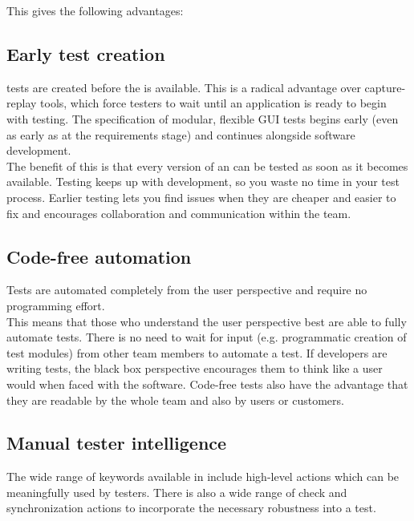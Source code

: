 This gives the following advantages: 

\subsection{Early test creation}

\app{} tests are created before the \gdaut{} is available. This is a radical advantage over capture-replay tools, which force testers to wait until an application is ready to begin with testing. The specification of modular, flexible GUI tests begins early (even as early as at the requirements stage) and continues alongside software development.\\ 
The benefit of this is that every version of an \gdaut{} can be tested as soon as it becomes available. Testing keeps up with development, so you waste no time in your test process. Earlier testing lets you find issues when they are cheaper and easier to fix and encourages collaboration and communication within the team.

\subsection{Code-free automation}

Tests are automated completely from the user perspective and require no programming effort. \\

This means that those who understand the user perspective best are able to fully automate tests. There is no need to wait for input (e.g. programmatic creation of test modules) from other team members to automate a test. If developers are writing tests, the black box perspective encourages them to think like a user would when faced with the software. Code-free tests also have the advantage that they are readable by the whole team and also by users or customers. 


\subsection{Manual tester intelligence}

The wide range of keywords available in \app{} include high-level actions which can be meaningfully used by testers. There is also a wide range of check and synchronization actions to incorporate the necessary robustness into a test. 


